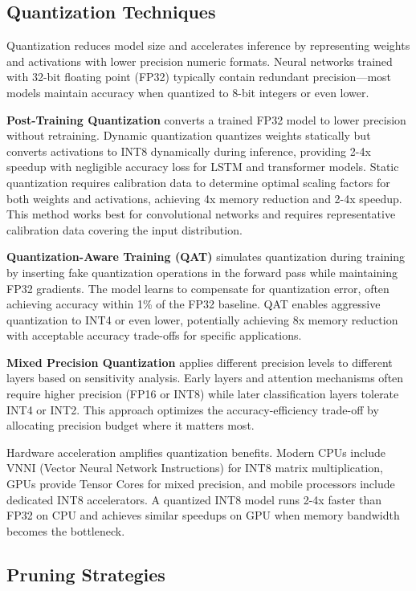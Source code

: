 \subsection{Quantization Techniques}

Quantization reduces model size and accelerates inference by representing weights and activations with lower precision numeric formats. Neural networks trained with 32-bit floating point (FP32) typically contain redundant precision---most models maintain accuracy when quantized to 8-bit integers or even lower.

\textbf{Post-Training Quantization} converts a trained FP32 model to lower precision without retraining. Dynamic quantization quantizes weights statically but converts activations to INT8 dynamically during inference, providing 2-4x speedup with negligible accuracy loss for LSTM and transformer models. Static quantization requires calibration data to determine optimal scaling factors for both weights and activations, achieving 4x memory reduction and 2-4x speedup. This method works best for convolutional networks and requires representative calibration data covering the input distribution.

\textbf{Quantization-Aware Training (QAT)} simulates quantization during training by inserting fake quantization operations in the forward pass while maintaining FP32 gradients. The model learns to compensate for quantization error, often achieving accuracy within 1\% of the FP32 baseline. QAT enables aggressive quantization to INT4 or even lower, potentially achieving 8x memory reduction with acceptable accuracy trade-offs for specific applications.

\textbf{Mixed Precision Quantization} applies different precision levels to different layers based on sensitivity analysis. Early layers and attention mechanisms often require higher precision (FP16 or INT8) while later classification layers tolerate INT4 or INT2. This approach optimizes the accuracy-efficiency trade-off by allocating precision budget where it matters most.

Hardware acceleration amplifies quantization benefits. Modern CPUs include VNNI (Vector Neural Network Instructions) for INT8 matrix multiplication, GPUs provide Tensor Cores for mixed precision, and mobile processors include dedicated INT8 accelerators. A quantized INT8 model runs 2-4x faster than FP32 on CPU and achieves similar speedups on GPU when memory bandwidth becomes the bottleneck.

\subsection{Pruning Strategies}

